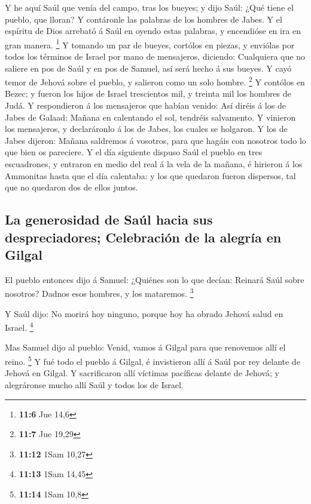  Y he aquí Saúl que venía del campo, tras los bueyes; y dijo
Saúl: ¿Qué tiene el pueblo, que lloran? Y contáronle las palabras de los
hombres de Jabes.  Y el espíritu de Dios arrebató á Saúl en
oyendo estas palabras, y encendióse en ira en gran manera. \footnote{\textbf{11:6}
  Jue 14,6}  Y tomando un par de bueyes, cortólos en piezas,
y enviólas por todos los términos de Israel por mano de mensajeros,
diciendo: Cualquiera que no saliere en pos de Saúl y en pos de Samuel,
así será hecho á sus bueyes. Y cayó temor de Jehová sobre el pueblo, y
salieron como un solo hombre. \footnote{\textbf{11:7} Jue 19,29}
 Y contólos en Bezec; y fueron los hijos de Israel
trescientos mil, y treinta mil los hombres de Judá.  Y
respondieron á los mensajeros que habían venido: Así diréis á los de
Jabes de Galaad: Mañana en calentando el sol, tendréis salvamento. Y
vinieron los mensajeros, y declaráronlo á los de Jabes, los cuales se
holgaron.  Y los de Jabes dijeron: Mañana saldremos á
vosotros, para que hagáis con nosotros todo lo que bien os pareciere.
 Y el día siguiente dispuso Saúl el pueblo en tres
escuadrones, y entraron en medio del real á la vela de la mañana, é
hirieron á los Ammonitas hasta que el día calentaba: y los que quedaron
fueron dispersos, tal que no quedaron dos de ellos juntos.

\hypertarget{la-generosidad-de-sauxfal-hacia-sus-despreciadores-celebraciuxf3n-de-la-alegruxeda-en-gilgal}{%
\subsection{La generosidad de Saúl hacia sus despreciadores; Celebración
de la alegría en
Gilgal}\label{la-generosidad-de-sauxfal-hacia-sus-despreciadores-celebraciuxf3n-de-la-alegruxeda-en-gilgal}}

 El pueblo entonces dijo á Samuel: ¿Quiénes son lo que
decían: Reinará Saúl sobre nosotros? Dadnos esos hombres, y los
mataremos. \footnote{\textbf{11:12} 1Sam 10,27}

 Y Saúl dijo: No morirá hoy ninguno, porque hoy ha obrado
Jehová salud en Israel. \footnote{\textbf{11:13} 1Sam 14,45}

 Mas Samuel dijo al pueblo: Venid, vamos á Gilgal para que
renovemos allí el reino. \footnote{\textbf{11:14} 1Sam 10,8}
 Y fué todo el pueblo á Gilgal, é invistieron allí á Saúl
por rey delante de Jehová en Gilgal. Y sacrificaron allí víctimas
pacíficas delante de Jehová; y alegráronse mucho allí Saúl y todos los
de Israel.

